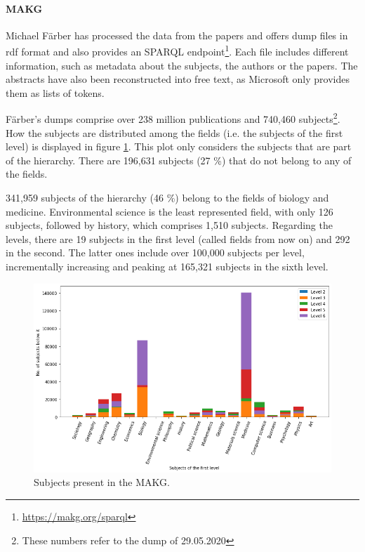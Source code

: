 \paragraph{MAKG} \mbox{}

Michael Färber has processed the data from the papers and offers dump files in \acrfull{rdf} format \cite{faerber2019microsoft} and also provides an SPARQL endpoint\footnote{\url{https://makg.org/sparql}}. Each file includes different information, such as metadata about the subjects, the authors or the papers. The abstracts have also been reconstructed into free text, as Microsoft only provides them as lists of tokens.

Färber's dumps comprise over 238 million publications and 740,460 subjects\footnote{These numbers refer to the dump of 29.05.2020}. How the subjects are distributed among the fields (i.e. the subjects of the first level) is displayed in figure \ref{fig:subjects_per_field_per_level}. This plot only considers the subjects that are part of the hierarchy. There are 196,631 subjects (27 \%) that do not belong to any of the fields.

341,959 subjects of the hierarchy (46 \%) belong to the fields of biology and medicine. Environmental science is the least represented field, with only 126 subjects, followed by history, which comprises 1,510 subjects. Regarding the levels, there are 19 subjects in the first level (called fields from now on) and 292 in the second. The latter ones include over 100,000 subjects per level, incrementally increasing and peaking at 165,321 subjects in the sixth level.

\begin{figure}
    \centering
    \includegraphics[width=\textwidth]{figures/related_work/makg/subjects_per_field_per_level.png}
    \caption{Subjects present in the MAKG.}
    \label{fig:subjects_per_field_per_level}
\end{figure}

